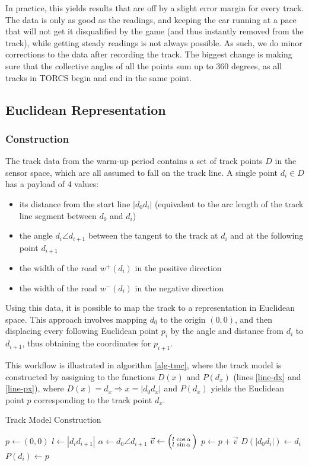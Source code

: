 \documentclass[conference]{IEEEtran}
\newcommand{\vect}[2]{\ensuremath{\Bigl(\negthinspace\begin{smallmatrix}#1\\#2\end{smallmatrix}}\Bigr)}
\begin{document}
In practice, this yields results that are off by a slight error margin for every track. The data is only as good as the readings, and keeping the car running at a pace that will not get it disqualified by the game (and thus instantly removed from the track), while getting steady readings is not always possible. As such, we do minor corrections to the data after recording the track. The biggest change is making sure that the collective angles of all the points sum up to 360 degrees, as all tracks in TORCS begin and end in the same point.

\subsection{Euclidean Representation}
\subsubsection{Construction}
The track data from the warm-up period contains a set of track points $D$ in the sensor space, which are all assumed to fall on the track line. A single point $d_i \in D$ has a payload of 4 values:
\begin{itemize}
\item its distance from the start line $|d_0 d_i|$ (equivalent to the arc length of the track line segment between $d_0$ and $d_i$)
\item the angle $d_i \angle d_{i+1}$ between the tangent to the track at $d_i$ and at the following point $d_{i+1}$
\item the width of the road $w^+(d_i)$ in the positive direction
\item the width of the road $w^-(d_i)$ in the negative direction
\end{itemize}

Using this data, it is possible to map the track to a representation in Euclidean space. This approach involves mapping $d_0$ to the origin $(0,0)$, and then displacing every following Euclidean point $p_i$ by the angle and distance from $d_i$ to $d_{i+1}$, thus obtaining the coordinates for $p_{i+1}$.

This workflow is illustrated in algorithm \ref{alg-tmc}, where the track model is constructed by assigning to the functions $D(x)$ and $P(d_x)$ (lines \ref{line-dx} and \ref{line-px}), where $D(x)=d_x \Rightarrow x=|d_0 d_x|$ and $P(d_x)$ yields the Euclidean point $p$ corresponding to the track point $d_x$.

\begin{algorithm}
\caption{Track Model Construction}
\label{alg-tmc}
\begin{algorithmic}[1]
\State $p \gets (0,0)$
	\State $l \gets |d_i d_{i+1}|$
	\State $\alpha \gets d_0 \angle d_{i+1}$
	\State $\vec{v} \gets \vect{l & \cos{\alpha}}{l & \sin{\alpha}}$
	\State $p \gets p+\vec{v}$
	\State $D(|d_0 d_i|) \gets d_i$ \label{line-dx}
	\State $P(d_i) \gets p$ \label{line-px}
\EndFor
\end{algorithmic}
\end{algorithm}
\end{document}
